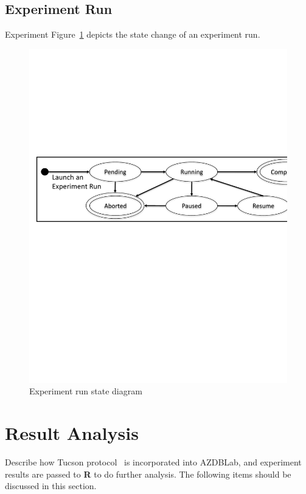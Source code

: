 \documentclass[conference]{IEEEtran}
\begin{document}
\subsection{Experiment Run}
Experiment 
Figure~\ref{fig:exp_run_state} depicts the state change of an experiment run. 

\begin{figure}[htp!]
\centering
\includegraphics[scale=0.4]{./figures/exp_run_state}
\caption{Experiment run state diagram\label{fig:exp_run_state}}
\end{figure}
  
\section{Result Analysis}\label{sec:result_analysis}
Describe how Tucson protocol~\cite{Currim} is incorporated into {\sc AZDBLab}, 
and experiment results are passed to {\bf R} to do further analysis. 
The following items should be discussed in this section.
\end{document}
